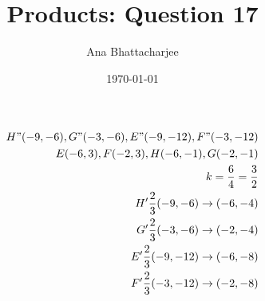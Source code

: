 \documentclass{article}
\begin{document}
\title{Products: Question 17}
\author{Ana Bhattacharjee}
\date{\today}
\maketitle{}

\begin{center}
\begin{align}
H" (-9, -6), G" (-3, -6), E" (-9, -12), F" (-3, -12) \\
E (-6, 3), F (-2, 3), H (-6, -1), G (-2, -1) \\
k = \frac{6}{4} = \frac{3}{2} \\
H' \frac{2}{3}(-9, -6) \rightarrow (-6, -4) \\
G' \frac{2}{3}(-3, -6) \rightarrow (-2, -4 ) \\
E' \frac{2}{3}(-9, -12) \rightarrow (-6, -8) \\
F' \frac{2}{3}(-3, -12) \rightarrow (-2, -8)
\end{align}
\end{center}
\end{document}

